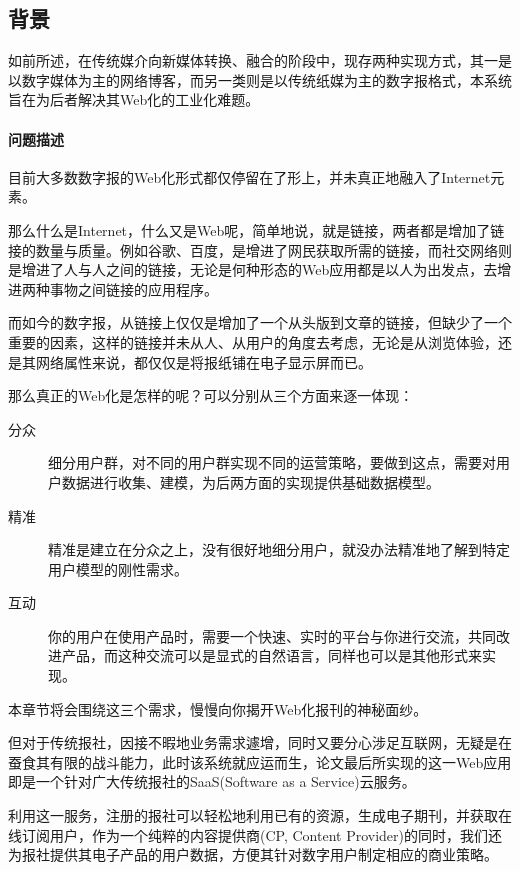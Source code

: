 
\subsection{背景}
如前所述，在传统媒介向新媒体转换、融合的阶段中，现存两种实现方式，其一是以数字媒体为主的网络博客，而另一类则是以传统纸媒为主的数字报格式，本系统旨在为后者解决其Web化的工业化难题。

\paragraph{问题描述}

目前大多数数字报的Web化形式都仅停留在了形上，并未真正地融入了Internet元素。

那么什么是Internet，什么又是Web呢，简单地说，就是链接，两者都是增加了链接的数量与质量。例如谷歌、百度，是增进了网民获取所需的链接，而社交网络则是增进了人与人之间的链接，无论是何种形态的Web应用都是以人为出发点，去增进两种事物之间链接的应用程序。

而如今的数字报，从链接上仅仅是增加了一个从头版到文章的链接，但缺少了一个重要的因素，这样的链接并未从人、从用户的角度去考虑，无论是从浏览体验，还是其网络属性来说，都仅仅是将报纸铺在电子显示屏而已。

\noindent
那么真正的Web化是怎样的呢？可以分别从三个方面来逐一体现：
\begin{description}
	\item[分众] 细分用户群，对不同的用户群实现不同的运营策略，要做到这点，需要对用户数据进行收集、建模，为后两方面的实现提供基础数据模型。
	\item[精准] 精准是建立在分众之上，没有很好地细分用户，就没办法精准地了解到特定用户模型的刚性需求。
	\item[互动] 你的用户在使用产品时，需要一个快速、实时的平台与你进行交流，共同改进产品，而这种交流可以是显式的自然语言，同样也可以是其他形式来实现。
\end{description}

\noindent
本章节将会围绕这三个需求，慢慢向你揭开Web化报刊的神秘面纱。

\indent
但对于传统报社，因接不暇地业务需求遽增，同时又要分心涉足互联网，无疑是在蚕食其有限的战斗能力，此时该系统就应运而生，论文最后所实现的这一Web应用即是一个针对广大传统报社的SaaS(Software as a Service)云服务。

\indent
利用这一服务，注册的报社可以轻松地利用已有的资源，生成电子期刊，并获取在线订阅用户，作为一个纯粹的内容提供商(CP, Content Provider)的同时，我们还为报社提供其电子产品的用户数据，方便其针对数字用户制定相应的商业策略。

